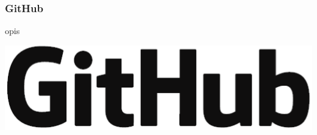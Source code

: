 \subsubsection*{GitHub}
opis
\begin{center}
    \includegraphics[scale=0.4]{images/GitHubLogo.eps}
    \label{fig:drukarka}
\end{center}